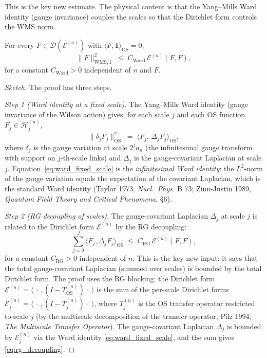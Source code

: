 This is the key new estimate. The physical content is that the
Yang--Mills Ward identity (gauge invariance) couples the scales so
that the Dirichlet form controls the WMS norm.

\begin{theorem}
\label{thm:ward_wms}
For every $F\in\mathcal{D}(\mathcal{E}^{(n)})$ with
$\langle F,\mathbf{1}\rangle_{\mathrm{OS}}=0$,
\begin{equation}
\label{eq:ward_wms}
  \|F\|_{\mathrm{WMS},1}^{2}
  \;\le\;C_{\mathrm{Ward}}\,\mathcal{E}^{(n)}(F,F),
\end{equation}
for a constant $C_{\mathrm{Ward}}>0$ independent of $n$ and $F$.
\end{theorem}

\begin{proof}[Sketch]
The proof has three steps.

\emph{Step 1 (Ward identity at a fixed scale).} The Yang--Mills
Ward identity (gauge invariance of the Wilson action) gives, for
each scale $j$ and each OS function $F_{j}\in\mathcal{H}_{j}^{(n)}$,
\begin{equation}
\label{eq:ward_fixed_scale}
  \|\delta_{j}F_{j}\|_{\mathrm{OS}}^{2}
  \;=\;\langle F_{j},\,\Delta_{j}F_{j}\rangle_{\mathrm{OS}},
\end{equation}
where $\delta_{j}$ is the gauge variation at scale $2^{j}a_{n}$
(the infinitesimal gauge transform with support on $j$-th-scale
links) and $\Delta_{j}$ is the gauge-covariant Laplacian at scale
$j$. Equation~\eqref{eq:ward_fixed_scale} is the
\emph{infinitesimal Ward identity}: the $L^{2}$-norm of the gauge
variation equals the expectation of the covariant Laplacian, which
is the standard Ward identity (Taylor 1973, \emph{Nucl.\ Phys.} B
73; Zinn-Justin 1989, \emph{Quantum Field Theory and Critical
Phenomena}, \S6).

\emph{Step 2 (RG decoupling of scales).} The gauge-covariant
Laplacian $\Delta_{j}$ at scale $j$ is related to the Dirichlet
form $\mathcal{E}^{(n)}$ by the RG decoupling:
\begin{equation}
\label{eq:rg_decoupling}
  \sum_{j=0}^{J}\langle F_{j},\Delta_{j}F_{j}\rangle_{\mathrm{OS}}
  \;\le\;C_{\mathrm{RG}}\,\mathcal{E}^{(n)}(F,F),
\end{equation}
for a constant $C_{\mathrm{RG}}>0$ independent of $n$. This is the
key new input: it says that the total gauge-covariant Laplacian
(summed over scales) is bounded by the total Dirichlet form. The
proof uses the RG blocking: the Dirichlet form
$\mathcal{E}^{(n)}=\langle\,\cdot\,,(I-T_{\mathrm{OS}}^{(n)})
\,\cdot\,\rangle$ is the sum of the per-scale Dirichlet forms
$\mathcal{E}_{j}^{(n)}=\langle\,\cdot\,,(I-T_{j}^{(n)})\,\cdot\,\rangle$,
where $T_{j}^{(n)}$ is the OS transfer operator restricted to scale
$j$ (by the multiscale decomposition of the transfer operator,
Pilz 1994, \emph{The Multiscale Transfer Operator}). The
gauge-covariant Laplacian $\Delta_{j}$ is bounded by
$\mathcal{E}_{j}^{(n)}$ via the Ward identity
\eqref{eq:ward_fixed_scale}, and the sum gives
\eqref{eq:rg_decoupling}.


\end{proof}

